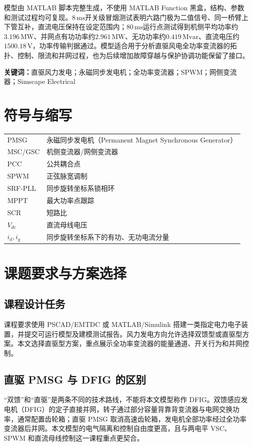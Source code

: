\documentclass[UTF8,zihao=-4,fontset=fandol]{ctexrep}
\begin{document}
模型由 MATLAB 脚本完整生成，不使用 MATLAB Function 黑盒，结构、参数和测试过程均可复现。\(8\,\mathrm{ms}\)开关级冒烟测试表明六路门极为二值信号、同一桥臂上下管互补，直流电压保持在设定范围内；\(80\,\mathrm{ms}\)运行点测试得到机侧平均功率约\(3.196\,\mathrm{MW}\)、并网点有功功率约\(2.961\,\mathrm{MW}\)、无功功率约\(0.419\,\mathrm{Mvar}\)、直流电压约\(1500.18\,\mathrm{V}\)，功率传输判据通过。模型适合用于分析直驱风电全功率变流器的拓扑、控制、限流和并网过程，也为后续增加故障穿越与保护协调功能保留了接口。

\noindent\textbf{关键词：}直驱风力发电；永磁同步发电机；全功率变流器；SPWM；网侧变流器；Simscape Electrical

\chapter*{符号与缩写}
\begin{longtable}{p{2.8cm}p{10.2cm}}
\toprule
PMSG & 永磁同步发电机（Permanent Magnet Synchronous Generator）\\
MSC/GSC & 机侧变流器/网侧变流器\\
PCC & 公共耦合点\\
SPWM & 正弦脉宽调制\\
SRF-PLL & 同步旋转坐标系锁相环\\
MPPT & 最大功率点跟踪\\
SCR & 短路比\\
\(V_{dc}\) & 直流母线电压\\
\(i_d,i_q\) & 同步旋转坐标系下的有功、无功电流分量\\
\bottomrule
\end{longtable}

\tableofcontents

\clearpage
{}
\chapter{课题要求与方案选择}
\section{课程设计任务}
课程要求使用 PSCAD/EMTDC 或 MATLAB/Simulink 搭建一类指定电力电子装置，并提交可运行模型及建模测试报告。风力发电方向允许选择双馈型或直驱型方案。本文选择直驱型方案，重点展示全功率变流器的能量通道、开关行为和并网控制。

\section{直驱 PMSG 与 DFIG 的区别}
“双馈”和“直驱”是两条不同的技术路线，不能将本文模型称作 DFIG。双馈感应发电机（DFIG）的定子直接并网，转子通过部分容量背靠背变流器与电网交换功率，通常配置齿轮箱；直驱 PMSG 取消高速齿轮箱，发电机全部功率经过全功率变流器后并网。本文模型的电气隔离和控制自由度更高，且与两电平 VSC、SPWM 和直流母线控制这一课程重点更契合。
\end{document}
